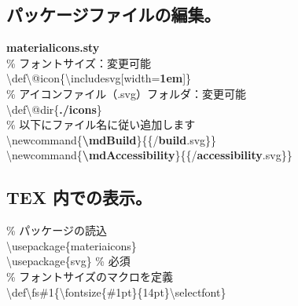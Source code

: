 \documentclass[10pt]{ltjarticle}
\def\fs#1{\fontsize{#1pt}{14pt}\selectfont}
\begin{document}
\subsection{パッケージファイルの編集。}
\textbf{materialicons.sty}\\  
{\fs{8}
\hspace{4mm}\% フォントサイズ：変更可能\vspace{1mm}\\
\hspace{4mm}\textbackslash def\textbackslash @icon\{\textbackslash includesvg[width=\textbf{1em}]\}\vspace{2mm}\\
\hspace{4mm}\% アイコンファイル（.svg）フォルダ：変更可能\vspace{1mm}\\
\hspace{4mm}\textbackslash def\textbackslash @dir\{\textbf{./icons}\}\vspace{2mm}\\
\hspace{4mm}\% 以下にファイル名に従い追加します\vspace{1mm}\\
\hspace{4mm}\textbackslash newcommand\{\textcolor{code}{\textbf{\textbackslash mdBuild}}\}\{\textbackslash@icon\{\textbackslash@dir/\textcolor{code}{\textbf{build}}.svg\}\}\\
\hspace{4mm}\textbackslash newcommand\{\textcolor{code}{\textbf{\textbackslash mdAccessibility}}\}\{\textbackslash@icon\{\textbackslash@dir/\textcolor{code}{\textbf{accessibility}}.svg\}\}
}

\subsection{TEX 内での表示。}
\% パッケージの読込\\
\hspace{4mm}\textbackslash usepackage\{materiaicons\}\\
\hspace{4mm}\textbackslash usepackage\{svg\} \% 必須\\

\% フォントサイズのマクロを定義\\
\hspace{4mm}\textbackslash def\textbackslash fs\#1\{\textbackslash fontsize\{\#1pt\}\{14pt\}\textbackslash selectfont\}
  
\end{document}

